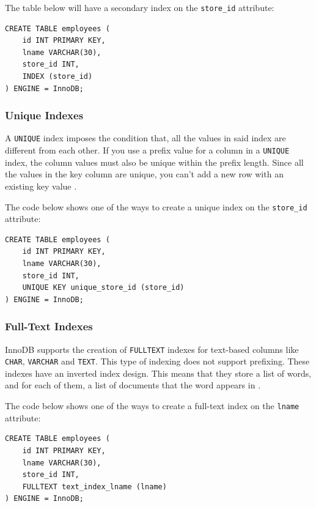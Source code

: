 \documentclass[12pt]{article}
\begin{document}
\noindent The table below will have a secondary index on the \verb|store_id| attribute:
\begin{verbatim}
CREATE TABLE employees (
    id INT PRIMARY KEY,
    lname VARCHAR(30),
    store_id INT,
    INDEX (store_id)
) ENGINE = InnoDB;
\end{verbatim}


\subsubsection{Unique Indexes}
\label{uniqueIndexes}
A \verb|UNIQUE| index imposes the condition that, all the values in said index are different from each other. If you use a prefix value for a column in a \verb|UNIQUE| index, the column values must also be unique within the prefix length. Since all the values in the key column are unique, you can't add a new row with an existing key value \parencite{UniqueIndexes}.

\vspace{0.3cm}

\noindent The code below shows one of the ways to create a unique index on the \verb|store_id| attribute:
\begin{verbatim}
CREATE TABLE employees (
    id INT PRIMARY KEY,
    lname VARCHAR(30),
    store_id INT,
    UNIQUE KEY unique_store_id (store_id)
) ENGINE = InnoDB;
\end{verbatim}


\subsubsection{Full-Text Indexes}
\label{fullTextIndexes}
InnoDB supports the creation of \verb|FULLTEXT| indexes for text-based columns like \verb|CHAR|, \verb|VARCHAR| and \verb|TEXT|. This type of indexing does not support prefixing. These indexes have an inverted index design. This means that they store a list of words, and for each of them, a list of documents that the word appears in \parencite{FullTextIndex}.

\vspace{0.3cm}

\noindent The code below shows one of the ways to create a full-text index on the \verb|lname| attribute:
\begin{verbatim}
CREATE TABLE employees (
    id INT PRIMARY KEY,
    lname VARCHAR(30),
    store_id INT,
    FULLTEXT text_index_lname (lname)
) ENGINE = InnoDB;
\end{verbatim}
\end{document}
